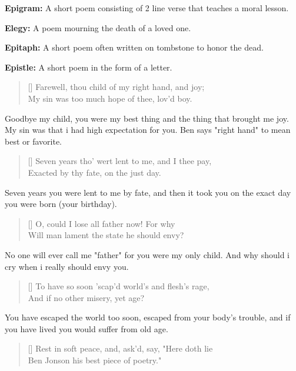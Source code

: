 \documentclass[12pt, a4paper]{article}
\begin{document}
{\textbf{Epigram:} A short poem consisting of 2 line verse that teaches a moral lesson.\medbreak

\textbf{Elegy:} A poem mourning the death of a loved one.\medbreak

\textbf{Epitaph:} A short poem often written on tombstone
to honor the dead.\medbreak

\textbf{Epistle:} A short poem in the form of a letter.




\settowidth{\versewidth}{Farewell, thou child of my right hand, and joy}
\begin{verse}[\versewidth]
{\fontverse
Farewell, thou child of my right hand, and joy;\\
My sin was too much hope of thee, lov'd boy. 
}
\end{verse}

Goodbye my child, you were my best thing and the thing that brought me joy.
My sin was that i had high expectation for you. Ben says "right 
hand" to mean best or favorite.

\begin{verse}[\versewidth]
{\fontverse
Seven years tho' wert lent to me, and I thee pay, \\
Exacted by thy fate, on the just day. 
}
\end{verse}

Seven years you were lent to me by fate, and then it took you on the 
exact day you were born (your birthday).

\begin{verse}[\versewidth]
{\fontverse
O, could I lose all father now! For why \\
Will man lament the state he should envy? 
}
\end{verse}

No one will ever call me "father" for you were my only child.
And why should i cry when i really should envy you.

\begin{verse}[\versewidth]
{\fontverse
To have so soon 'scap'd world's and flesh's rage, \\
And if no other misery, yet age?
}
\end{verse}

You have escaped the world too soon, escaped from your
body's trouble, and if you have lived you would suffer from old age.\bigbreak

\begin{verse}[\versewidth]
{\fontverse
Rest in soft peace, and, ask'd, say, "Here doth lie \\
Ben Jonson his best piece of poetry." 
}
\end{verse}

}
\end{document}

